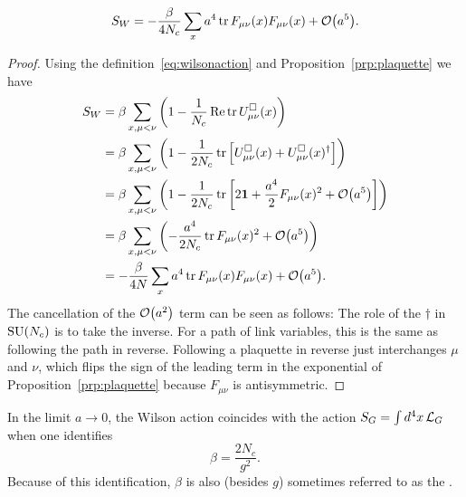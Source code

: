 \begin{proposition}{}{} 
  $$S_W=-\frac{\beta}{4N_c}\sum_x a^4\tr F_{\mu\nu}(x)F_{\mu\nu}(x)
                  +\order{a^5}.$$
  \begin{proof} Using the definition~\eqref{eq:wilsonaction} and
    Proposition~\ref{prp:plaquette} we have
    \begin{equation*}
    \begin{aligned}
      S_W&=\beta\sum_{x,\mu<\nu}\left(1-\frac{1}{N_c}\Re\tr 
            U_{\mu\nu}^\Box(x)\right)\\
         &=\beta\sum_{x,\mu<\nu}\left(1-\frac{1}{2N_c}\tr 
            \left[U_{\mu\nu}^\Box(x)+
            U_{\mu\nu}^\Box(x)^\dagger\right]\right)\\
         &=\beta\sum_{x,\mu<\nu}\left(1-\frac{1}{2N_c}\tr
            \left[2\id+\frac{a^4}{2}F_{\mu\nu}(x)^2
                  +\order{a^5}\right]\right)\\
         &=\beta\sum_{x,\mu<\nu}\left(-\frac{a^4}{2N_c}\tr F_{\mu\nu}(x)^2
                  +\order{a^5}\right)\\
         &=-\frac{\beta}{4N}\sum_x a^4\tr F_{\mu\nu}(x)F_{\mu\nu}(x)
                  +\order{a^5}.
    \end{aligned}
    \end{equation*}
    The cancellation of the $\order{a^2}$ term can be seen
    as follows: The role of the $\dagger$ in $\operatorname{SU}(N_c)$ is to take the inverse.
    For a path of link variables, this is the same as following the path
    in reverse.
    Following a plaquette in reverse just interchanges $\mu$ and $\nu$,
    which flips the sign of the leading term in the exponential
    of Proposition~\ref{prp:plaquette} because $F_{\mu\nu}$
    is antisymmetric.
  \end{proof}
\end{proposition}

In the limit $a\to0$, the Wilson action coincides with the action
$S_G=\int d^4x\,\mathcal{L}_G$ when one identifies 
\begin{equation}
  \beta=\frac{2N_c}{g^2}.
\end{equation}
Because of this identification, $\beta$ is also (besides $g$) sometimes 
referred to as the .

